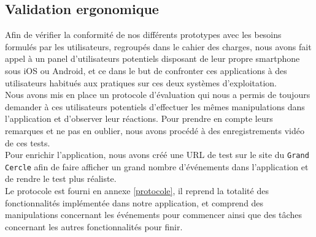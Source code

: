 \documentclass[a4paper, 11px]{article}
\begin{document}
\subsection{Validation ergonomique}
Afin de vérifier la conformité de nos différents prototypes avec les besoins formulés par les utilisateurs, regroupés dans le cahier des charges, nous avons fait appel à un panel d'utilisateurs potentiels disposant de leur propre smartphone sous iOS ou Android, et ce dans le but de confronter ces applications à des utilisateurs habitués aux pratiques sur ces deux systèmes d'exploitation.\\

Nous avons mis en place un protocole d'évaluation qui nous a permis de toujours demander à ces utilisateurs potentiels d'effectuer les mêmes manipulations dans l'application et d'observer leur réactions. Pour prendre en compte leurs remarques et ne pas en oublier, nous avons procédé à des enregistrements vidéo de ces tests.\\
Pour enrichir l'application, nous avons créé une URL de test sur le site du \texttt{Grand Cercle} afin de faire afficher un grand nombre d'événements dans l'application et de rendre le test plus réaliste.\\

Le protocole est fourni en annexe \ref{protocole}, il reprend la totalité des fonctionnalités implémentée dans notre application, et comprend des manipulations concernant les événements pour commencer ainsi que des tâches concernant les autres fonctionnalités pour finir.


\appendix
\addappheadtotoc

\newpage
\end{document}
